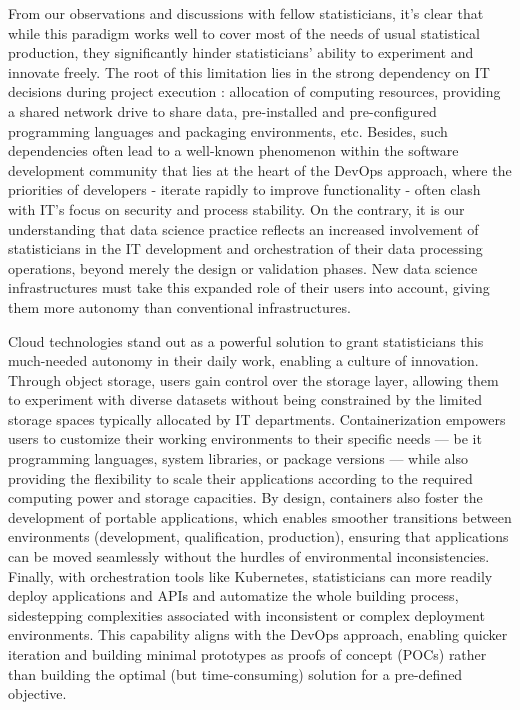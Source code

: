 From our observations and discussions with fellow statisticians, it's clear that while this paradigm works well to cover most of the needs of usual statistical production, they significantly hinder statisticians' ability to experiment and innovate freely. The root of this limitation lies in the strong dependency on IT decisions during project execution : allocation of computing resources, providing a shared network drive to share data, pre-installed and pre-configured programming languages and packaging environments, etc. Besides, such dependencies often lead to a well-known phenomenon within the software development community that lies at the heart of the DevOps approach, where the priorities of developers - iterate rapidly to improve functionality - often clash with IT's focus on security and process stability. On the contrary, it is our understanding that data science practice reflects an increased involvement of statisticians in the IT development and orchestration of their data processing operations, beyond merely the design or validation phases. New data science infrastructures must take this expanded role of their users into account, giving them more autonomy than conventional infrastructures.

Cloud technologies stand out as a powerful solution to grant statisticians this much-needed autonomy in their daily work, enabling a culture of innovation. Through object storage, users gain control over the storage layer, allowing them to experiment with diverse datasets without being constrained by the limited storage spaces typically allocated by IT departments. Containerization empowers users to customize their working environments to their specific needs — be it programming languages, system libraries, or package versions — while also providing the flexibility to scale their applications according to the required computing power and storage capacities. By design, containers also foster the development of portable applications, which enables smoother transitions between environments (development, qualification, production), ensuring that applications can be moved seamlessly without the hurdles of environmental inconsistencies. Finally, with orchestration tools like Kubernetes, statisticians can more readily deploy applications and APIs and automatize the whole building process, sidestepping complexities associated with inconsistent or complex deployment environments. This capability aligns with the DevOps approach, enabling quicker iteration and building minimal prototypes as proofs of concept (POCs) rather than building the optimal (but time-consuming) solution for a pre-defined objective.

